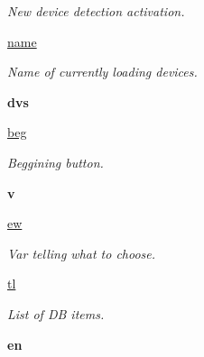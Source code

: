 \begin{DoxyCompactItemize}
\begin{DoxyCompactList}\small\item\em New device detection activation. \end{DoxyCompactList}\item 
\hypertarget{classmnWindow_1_1App_a12abbfb4d033c684d65bb555d61b2d5a}{\hyperlink{classmnWindow_1_1App_a12abbfb4d033c684d65bb555d61b2d5a}{name}}\label{classmnWindow_1_1App_a12abbfb4d033c684d65bb555d61b2d5a}

\begin{DoxyCompactList}\small\item\em Name of currently loading devices. \end{DoxyCompactList}\item 
\hypertarget{classmnWindow_1_1App_af69811a5d0fe5a1c25c4b3dbda906dc3}{{\bfseries dvs}}\label{classmnWindow_1_1App_af69811a5d0fe5a1c25c4b3dbda906dc3}

\item 
\hypertarget{classmnWindow_1_1App_a1ecace680297abb30e0525f6336e6ad6}{\hyperlink{classmnWindow_1_1App_a1ecace680297abb30e0525f6336e6ad6}{beg}}\label{classmnWindow_1_1App_a1ecace680297abb30e0525f6336e6ad6}

\begin{DoxyCompactList}\small\item\em Beggining button. \end{DoxyCompactList}\item 
\hypertarget{classmnWindow_1_1App_aca1d00ea1052ac20f926348d4d5f73e4}{{\bfseries v}}\label{classmnWindow_1_1App_aca1d00ea1052ac20f926348d4d5f73e4}

\item 
\hypertarget{classmnWindow_1_1App_a2c4678ace0b9f4bbf7e0970914b32ab0}{\hyperlink{classmnWindow_1_1App_a2c4678ace0b9f4bbf7e0970914b32ab0}{ew}}\label{classmnWindow_1_1App_a2c4678ace0b9f4bbf7e0970914b32ab0}

\begin{DoxyCompactList}\small\item\em Var telling what to choose. \end{DoxyCompactList}\item 
\hypertarget{classmnWindow_1_1App_aa3bdf8ebe04fbd8731def76c830e4293}{\hyperlink{classmnWindow_1_1App_aa3bdf8ebe04fbd8731def76c830e4293}{tl}}\label{classmnWindow_1_1App_aa3bdf8ebe04fbd8731def76c830e4293}

\begin{DoxyCompactList}\small\item\em List of D\-B items. \end{DoxyCompactList}\item 
\hypertarget{classmnWindow_1_1App_aa13141f8175c2e7232b620272e953bc9}{{\bfseries en}}\label{classmnWindow_1_1App_aa13141f8175c2e7232b620272e953bc9}


\end{DoxyCompactItemize}
